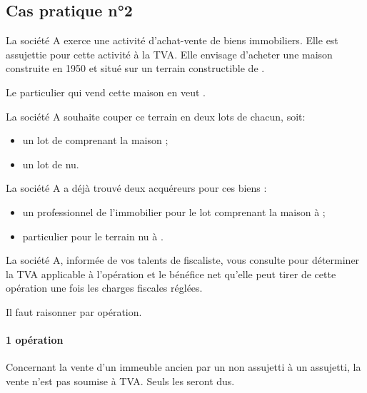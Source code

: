 	\subsection*{Cas pratique n°2}
	
		\begin{enonce}
			La société A exerce une activité d’achat-vente de biens immobiliers.  Elle est assujettie pour cette activité à la TVA. Elle envisage d’acheter une maison construite en 1950 et situé sur un terrain constructible de .

		
			\medskip Le particulier qui vend cette maison en veut .

			
			\medskip La société A souhaite couper ce terrain en deux lots de  chacun, soit:

			\begin{itemize}
				\item un lot de  comprenant la maison ;

				\item un lot de  nu.

			\end{itemize}
			
			\medskip La société A a déjà trouvé deux acquéreurs pour ces biens :

			\begin{itemize}
				\item un professionnel de l’immobilier pour le lot comprenant la maison à  ;

				\item particulier pour le terrain nu à .
			\end{itemize}

			
			\medskip La société A, informée de vos talents de fiscaliste, vous consulte pour déterminer la TVA applicable à l’opération et le bénéfice net qu’elle peut tirer de cette opération une fois les charges fiscales réglées.

		\end{enonce}
	
		Il faut raisonner par opération.
		
		\paragraph{1\iere{} opération} Concernant la vente d'un immeuble ancien par un non assujetti à un assujetti, la vente n'est pas soumise à TVA. Seuls les \dmto seront dus.
		
